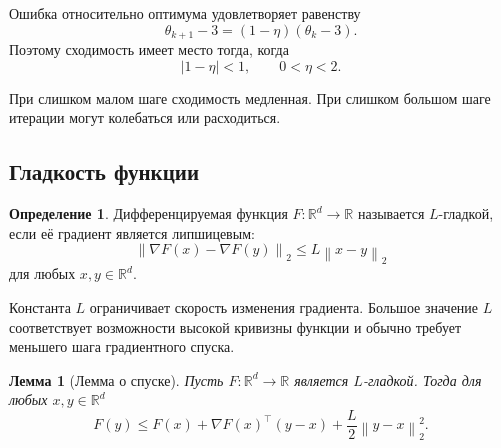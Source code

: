 \documentclass[12pt,a4paper]{article}
\theoremstyle{plain}
\newtheorem{lemma}[theorem]{Лемма}
\theoremstyle{definition}
\newtheorem{definition}{Определение}[section]
\theoremstyle{remark}
\newcommand{\R}{\mathbb{R}}
\newcommand{\norm}[1]{\left\lVert #1 \right\rVert}
\newcommand{\abs}[1]{\left| #1 \right|}
\begin{document}
Ошибка относительно оптимума удовлетворяет равенству
\[
    \theta_{k+1}-3
    =
    (1-\eta)(\theta_k-3).
\]
Поэтому сходимость имеет место тогда, когда
\[
    \abs{1-\eta}<1,
    \qquad
    0<\eta<2.
\]

При слишком малом шаге сходимость медленная. При слишком большом
шаге итерации могут колебаться или расходиться.

\subsection{Гладкость функции}

\begin{definition}
Дифференцируемая функция $F\colon\R^d\to\R$ называется
$L$-гладкой, если её градиент является липшицевым:
\[
    \norm{\nabla F(x)-\nabla F(y)}_2
    \leq
    L\norm{x-y}_2
\]
для любых $x,y\in\R^d$.
\end{definition}

Константа $L$ ограничивает скорость изменения градиента. Большое
значение $L$ соответствует возможности высокой кривизны функции и
обычно требует меньшего шага градиентного спуска.

\begin{lemma}[Лемма о спуске]
Пусть $F\colon\R^d\to\R$ является $L$-гладкой. Тогда для любых
$x,y\in\R^d$
\[
    F(y)
    \leq
    F(x)
    +
    \nabla F(x)^\top(y-x)
    +
    \frac{L}{2}\norm{y-x}_2^2.
\]
\end{lemma}
\end{document}
